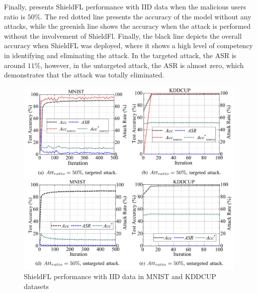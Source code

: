 Finally,  presents ShieldFL performance with IID data when the malicious users ratio is $50\%$.
The red dotted line presents the accuracy of the model without any attacks, while the greenish line shows the accuracy when the attack is performed without the involvement of ShieldFl.
Finally, the black line depicts the overall accuracy when ShieldFL was deployed, where it shows a high level of competency in identifying and eliminating the attack.
In the targeted attack, the ASR is around $11\%$, however, in the untargeted attack, the ASR is almost zero, which demonstrates that the attack was totally eliminated.

\begin{figure}[thb]
\centering
  \includegraphics[width=0.8\linewidth]{resources/shield-fl-performance-with-iid-data.pdf}
  \caption{ShieldFL performance with IID data in MNIST and KDDCUP datasets}
  \label{fig:shield-fl-performance-with-iid-data}
\end{figure}